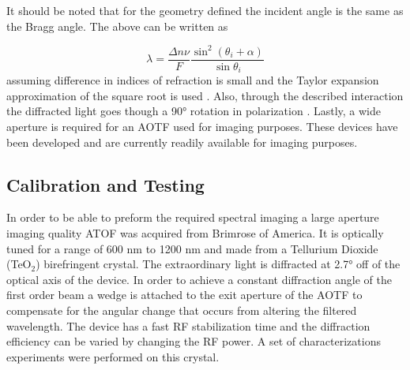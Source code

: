 It should be noted that for the geometry defined the incident angle is the same as the Bragg angle. The above can be written as

\begin{equation}
    \lambda  = \frac{\Delta n\nu}{F}\frac{\sin^{2}(\theta_{i}+\alpha)}{\sin\theta_{i}}
    \label{eqn:3.1:AOTFWavelengthDependance}
\end{equation}
assuming difference in indices of refraction is small and the Taylor expansion approximation of the square root is used \citep{Voloshinov2006}. Also, through the described interaction the diffracted light goes though a 90\si{\degree} rotation in polarization \citep{Voloshinov1996}. Lastly, a wide aperture is required for an AOTF used for imaging purposes. These devices have been developed \citep{Gass1991} and are currently readily available for imaging purposes.

\subsection{Calibration and Testing}
\label{sec:3.1:AOTFCalibration}

In order to be able to preform the required spectral imaging a large aperture imaging quality ATOF was acquired from Brimrose of America. It is optically tuned for a range of 600 nm to 1200 nm and made from a Tellurium Dioxide (TeO$_{2}$) birefringent crystal. The extraordinary light is diffracted at 2.7\si{\degree} off of the optical axis of the device. In order to achieve a constant diffraction angle of the first order beam a wedge is attached to the exit aperture of the AOTF to compensate for the angular change that occurs from altering the filtered wavelength.  The device has a fast RF stabilization time and the diffraction efficiency can be varied by changing the RF power. A set of characterizations experiments were performed on this crystal.

